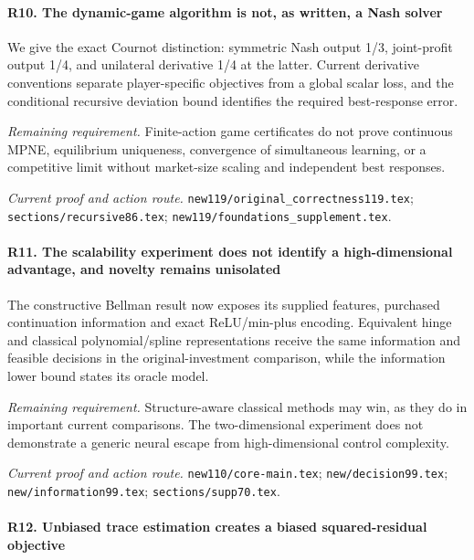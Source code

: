 \paragraph{R10. The dynamic-game algorithm is not, as written, a Nash solver}

We give the exact Cournot distinction: symmetric Nash output 1/3, joint-profit output 1/4, and unilateral derivative 1/4 at the latter. Current derivative conventions separate player-specific objectives from a global scalar loss, and the conditional recursive deviation bound identifies the required best-response error.

\par\emph{Remaining requirement.} Finite-action game certificates do not prove continuous MPNE, equilibrium uniqueness, convergence of simultaneous learning, or a competitive limit without market-size scaling and independent best responses.

\par\emph{Current proof and action route.} \nolinkurl{new119/original_correctness119.tex}; \nolinkurl{sections/recursive86.tex}; \nolinkurl{new119/foundations_supplement.tex}.

\paragraph{R11. The scalability experiment does not identify a high-dimensional advantage, and novelty remains unisolated}

The constructive Bellman result now exposes its supplied features, purchased continuation information and exact ReLU/\allowbreak{}min-plus encoding. Equivalent hinge and classical polynomial/\allowbreak{}spline representations receive the same information and feasible decisions in the original-investment comparison, while the information lower bound states its oracle model.

\par\emph{Remaining requirement.} Structure-aware classical methods may win, as they do in important current comparisons. The two-dimensional experiment does not demonstrate a generic neural escape from high-dimensional control complexity.

\par\emph{Current proof and action route.} \nolinkurl{new110/core-main.tex}; \nolinkurl{new/decision99.tex}; \nolinkurl{new/information99.tex}; \nolinkurl{sections/supp70.tex}.

\paragraph{R12. Unbiased trace estimation creates a biased squared-residual objective}


